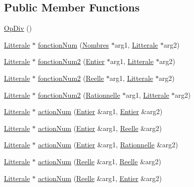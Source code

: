 \subsection*{Public Member Functions}
\begin{DoxyCompactItemize}
\item 
\hyperlink{class_op_div_a64f38b0d2adae50cbf651ada585810ea}{Op\+Div} ()
\item 
\hyperlink{class_litterale}{Litterale} $\ast$ \hyperlink{class_op_div_a2607c7a6356f4a3d358070b924e077ad}{fonction\+Num} (\hyperlink{class_nombres}{Nombres} $\ast$arg1, \hyperlink{class_litterale}{Litterale} $\ast$arg2)
\item 
\hyperlink{class_litterale}{Litterale} $\ast$ \hyperlink{class_op_div_acf1f9e49992b576d715c0bc0aaefaa24}{fonction\+Num2} (\hyperlink{class_entier}{Entier} $\ast$arg1, \hyperlink{class_litterale}{Litterale} $\ast$arg2)
\item 
\hyperlink{class_litterale}{Litterale} $\ast$ \hyperlink{class_op_div_a016aa0cfa3c8d176e515e78afed45a8a}{fonction\+Num2} (\hyperlink{class_reelle}{Reelle} $\ast$arg1, \hyperlink{class_litterale}{Litterale} $\ast$arg2)
\item 
\hyperlink{class_litterale}{Litterale} $\ast$ \hyperlink{class_op_div_a677140cc668980aa58768cf9517dd93e}{fonction\+Num2} (\hyperlink{class_rationnelle}{Rationnelle} $\ast$arg1, \hyperlink{class_litterale}{Litterale} $\ast$arg2)
\item 
\hyperlink{class_litterale}{Litterale} $\ast$ \hyperlink{class_op_div_a69b78b419ca90cfbd06c605130a5d0d1}{action\+Num} (\hyperlink{class_entier}{Entier} \&arg1, \hyperlink{class_entier}{Entier} \&arg2)
\item 
\hyperlink{class_litterale}{Litterale} $\ast$ \hyperlink{class_op_div_aa1de7148231747407140399b98fea6fc}{action\+Num} (\hyperlink{class_entier}{Entier} \&arg1, \hyperlink{class_reelle}{Reelle} \&arg2)
\item 
\hyperlink{class_litterale}{Litterale} $\ast$ \hyperlink{class_op_div_ae03a26237e3b8c8fe86e4f01b6daf2a6}{action\+Num} (\hyperlink{class_entier}{Entier} \&arg1, \hyperlink{class_rationnelle}{Rationnelle} \&arg2)
\item 
\hyperlink{class_litterale}{Litterale} $\ast$ \hyperlink{class_op_div_a7f38b0bb29be73d3b63404f5ae94c59f}{action\+Num} (\hyperlink{class_reelle}{Reelle} \&arg1, \hyperlink{class_reelle}{Reelle} \&arg2)
\item 
\hyperlink{class_litterale}{Litterale} $\ast$ \hyperlink{class_op_div_ab59aadcf7f16ef73877224e53467fc52}{action\+Num} (\hyperlink{class_reelle}{Reelle} \&arg1, \hyperlink{class_entier}{Entier} \&arg2)

\end{DoxyCompactItemize}
